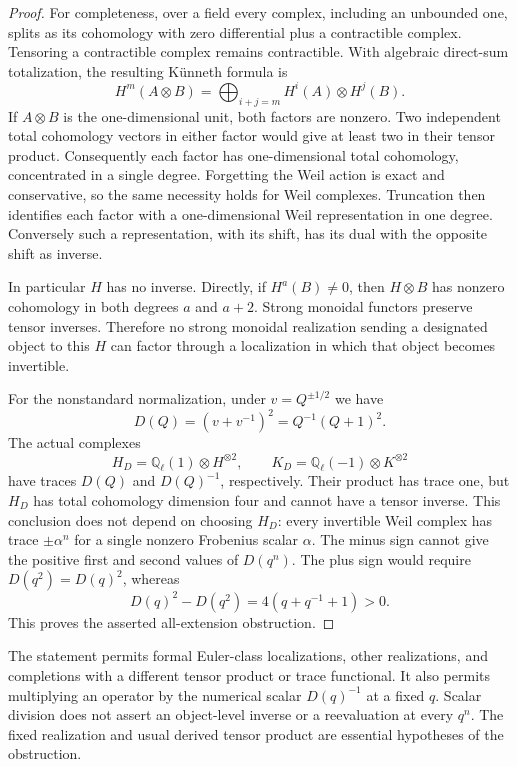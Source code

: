 \documentclass[11pt,a4paper]{article}
\newcommand{\Q}{\mathbb Q}\newcommand{\Z}{\mathbb Z}\newcommand{\C}{\mathbb C}\newcommand{\N}{\mathbb N}\newcommand{\F}{\mathbb F}
\theoremstyle{named}\newtheorem{finding}{Finding}[section]
\theoremstyle{definition}\newtheorem{definition}[finding]{Definition}
\theoremstyle{remark}\newtheorem{remark}[finding]{Remark}
\begin{document}
\begin{proof}
For completeness, over a field every complex, including an
unbounded one, splits as its cohomology with zero differential
plus a contractible complex. Tensoring a contractible complex
remains contractible. With algebraic direct-sum totalization,
the resulting K\"unneth formula is
\[
 H^m(A\otimes B)=\bigoplus_{i+j=m}H^i(A)\otimes H^j(B).
\]
If $A\otimes B$ is the one-dimensional unit, both factors are
nonzero. Two independent total cohomology vectors in either
factor would give at least two in their tensor product.
Consequently each factor has one-dimensional total cohomology,
concentrated in a single degree. Forgetting the Weil action is
exact and conservative, so the same necessity holds for Weil
complexes. Truncation then identifies each factor with a
one-dimensional Weil representation in one degree. Conversely
such a representation, with its shift, has its dual with the
opposite shift as inverse.

In particular $H$ has no inverse. Directly, if $H^a(B)\ne0$,
then $H\otimes B$ has nonzero cohomology in both degrees $a$
and $a+2$. Strong monoidal functors preserve tensor inverses.
Therefore no strong monoidal realization sending a designated
object to this $H$ can factor through a localization in which
that object becomes invertible.

For the nonstandard normalization, under $v=Q^{\pm1/2}$ we have
\[
 D(Q)=(v+v^{-1})^2=Q^{-1}(Q+1)^2.
\]
The actual complexes
\[
 H_D=\Q_\ell(1)\otimes H^{\otimes2},\qquad
 K_D=\Q_\ell(-1)\otimes K^{\otimes2}
\]
have traces $D(Q)$ and $D(Q)^{-1}$, respectively. Their product
has trace one, but $H_D$ has total cohomology dimension four and
cannot have a tensor inverse. This conclusion does not depend
on choosing $H_D$: every invertible Weil complex has trace
$\pm\alpha^n$ for a single nonzero Frobenius scalar $\alpha$.
The minus sign cannot give the positive first and second values
of $D(q^n)$. The plus sign would require $D(q^2)=D(q)^2$, whereas
\[
 D(q)^2-D(q^2)=4(q+q^{-1}+1)>0.
\]
This proves the asserted all-extension obstruction.
\end{proof}

The statement permits formal Euler-class localizations, other
realizations, and completions with a different tensor product or
trace functional. It also permits multiplying an operator by the
numerical scalar $D(q)^{-1}$ at a fixed $q$. Scalar division does
not assert an object-level inverse or a reevaluation at every
$q^n$. The fixed realization and usual derived tensor product
are essential hypotheses of the obstruction.
\end{document}
